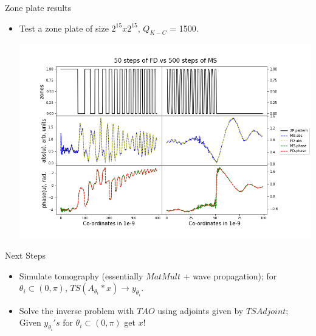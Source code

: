 \documentclass{beamer}
\begin{document}
\begin{frame}{Zone plate results}
\begin{itemize}
	\item Test a zone plate of size $2^{15} x 2^{15}$, $Q_{K-C}$ = 1500.
	\begin{center}
		\includegraphics[scale=0.325]{fdms}
	\end{center}
\end{itemize}
\end{frame}



\begin{frame}{Next Steps}
	\begin{itemize}
		\item Simulate tomography (essentially $MatMult$ + wave propagation); for $\theta_i\subset(0,\pi)$, $TS(A_{\theta_i}*x)\rightarrow y_{\theta_i}$.
		\item Solve the inverse problem with $TAO$ using adjoints given by $TSAdjoint$; Given $y_{\theta_i}'s \mbox{ for }  \theta_i\subset(0,\pi)$ get $x$!
	\end{itemize}
\end{frame}

\end{document}
